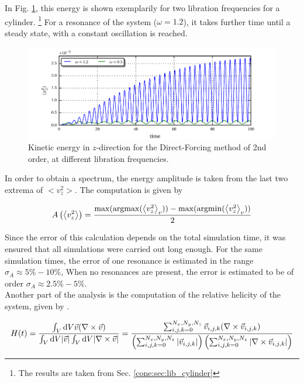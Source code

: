 In Fig. \ref{fig:cone:cyl_vzmode}, this energy is shown exemplarily for two libration frequencies for a cylinder.
\footnote{The results are taken from Sec. \ref{cone:sec:lib_cylinder}}
For a resonance of the system ($\omega=1.2$), it takes further time until a steady state, with a constant oscillation is reached.

\begin{figure}[!pb]
  \includegraphics{gfx/cone/cylinder/cyl_vz.pdf}
  \caption{Kinetic energy in $z$-direction for the Direct-Forcing method of 2nd order, at different libration frequencies.
  \label{fig:cone:cyl_vzmode}
  }
\end{figure}
\clearpage

In order to obtain a spectrum, the energy amplitude is taken from the last two extrema of $<v_z^2>$.
The computation is given by

\begin{align}
    A\left(\left<v_z^2\right>\right) = \frac{\max(\operatorname*{argmax}(\left<v_z^2\right>_{v})) - \max(\operatorname*{argmin}(\left<v_z^2\right>_{v}))}{2}
\end{align}

Since the error of this calculation depends on the total simulation time, it was ensured that all simulations
were carried out long enough.
For the same simulation times, the error of one resonance is estimated in the range $\sigma_A \approx 5\% - 10\%$,
When no resonances are present, the error is estimated to be of order $\sigma_A \approx 2.5\% - 5\%$.\\
Another part of the analysis is the computation of the relative helicity of the system, given by \citep{PAPER}.

\begin{align}
H(t) = \frac{\int_V \mathop{}\!\mathrm{d} V \vec{v} (\nabla \times \vec{v})}
{\int_V \mathop{}\!\mathrm{d} V |\vec{v}| \int_V \mathop{}\!\mathrm{d} V |\nabla \times \vec{v}|}
 = \frac{\sum_{i,j,k=0}^{N_x, N_y, N_z} \vec{v}_{i,j,k} (\nabla \times \vec{v}_{i, j, k})}
 {\left(\sum_{i,j,k=0}^{N_x, N_y, N_z}|\vec{v}_{i,j,k}|\right)
 \left(\sum_{i,j,k=0}^{N_x, N_y, N_z}
 | \nabla \times \vec{v}_{i, j, k}|\right)}
\end{align}

